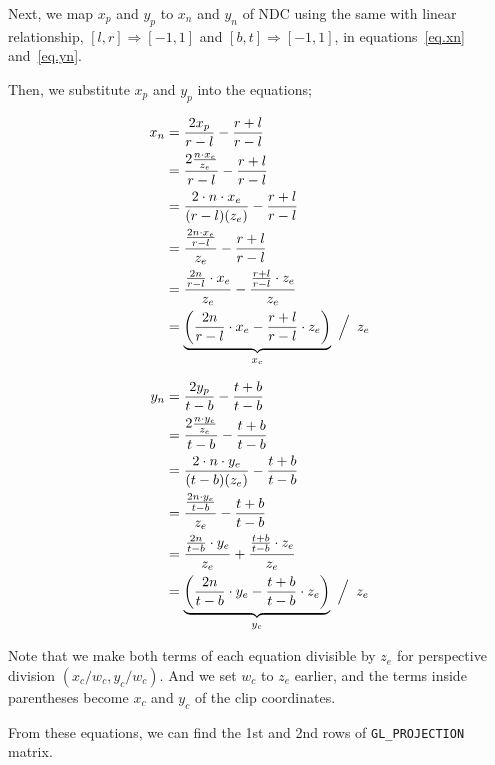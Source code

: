 Next, we map $x_p$ and $y_p$ to $x_n$ and $y_n$ of NDC using the same with linear relationship, $[l, r] \Rightarrow [-1, 1]$ and $[b, t] \Rightarrow [-1, 1]$, in equations~\ref{eq.xn} and~\ref{eq.yn}.

Then, we substitute $x_p$ and $y_p$ into the equations;

\begin{equation}
    \begin{aligned}
x_n& = \frac{2x_p}{r-l} - \frac{r+l}{r-l}\\
   &=\frac{2 \frac{n \cdot x_e}{z_e} }{r-l} -                    \frac{r+l}{r-l}\\
   &=\frac{2 \cdot n \cdot x_e}{(r-l)(z_e)} -
   \frac{r+l}{r-l}\\
   &=\frac{ \frac{2n\cdot x_e}{r-l} }{z_e}  -
   \frac{r+l}{r-l}\\
   &=\frac{ \frac{2n}{r-l} \cdot x_e }{z_e} - 
   \frac{ \frac{r+l}{r-l} \cdot z_e}{z_e}\\
   &=\underbrace{\left( \frac{2n}{r-l} \cdot x_e - \frac{r+l}{r-l}\cdot z_e\right)}_{x_c} \left.\frac{}{}\middle/\frac{}{}\right.{z_e}
   \end{aligned}
\end{equation}

\begin{equation}
    \begin{aligned}
y_n& = \frac{2y_p}{t-b} - \frac{t+b}{t-b}\\
   &=\frac{2 \frac{n \cdot y_e}{z_e} }{t-b} -
   \frac{t+b}{t-b}\\
   &=\frac{2 \cdot n \cdot y_e}{(t-b)(z_e)} -
   \frac{t+b}{t-b}\\
   &=\frac{ \frac{2n\cdot y_e}{t-b} }{z_e}  - 
   \frac{t+b}{t-b}\\
   &=\frac{ \frac{2n}{t-b} \cdot y_e }{z_e} + 
   \frac{ \frac{t+b}{t-b} \cdot z_e}{z_e}\\
   &=\underbrace{\left( \frac{2n}{t-b} \cdot y_e -
   \frac{t+b}{t-b}\cdot z_e\right)}_{y_c}
   \left.\frac{}{}\middle/\frac{}{}\right.{z_e}\\
    \end{aligned}
\end{equation}

Note that we make both terms of each equation divisible by $z_e$ for perspective division $(x_c/w_c, y_c/w_c)$. And we set $w_c$ to $z_e$ earlier, and the terms inside parentheses become $x_c$ and $y_c$ of the clip coordinates.

From these equations, we can find the 1st and 2nd rows of \verb|GL_PROJECTION| matrix. 

